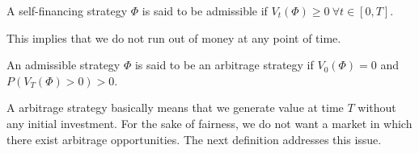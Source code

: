 \begin{dfn}
	A self-financing strategy $ \Phi $ is said to be admissible if $ V_t( \Phi ) \ge 0 \  \forall t \in [0, T] $.
\end{dfn}
This implies that we do not run out of money at any point of time.

\begin{dfn}
	An admissible strategy $ \Phi $ is said to be an arbitrage strategy if $ V_0( \Phi ) = 0 $ and $ P( V_T( \Phi ) > 0 ) > 0 $.
\end{dfn}
A arbitrage strategy basically means that we generate value at time $ T $ without any initial investment. For the sake of fairness, we do not want a market in which there exist arbitrage opportunities. The next definition addresses this issue.

